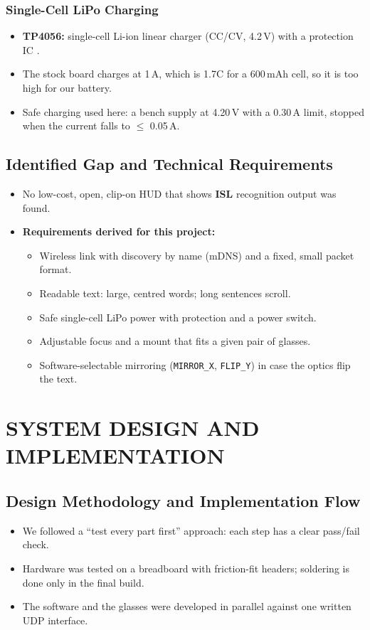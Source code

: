 \documentclass[12pt,a4paper]{report}
\begin{document}
\subsection{Single-Cell LiPo Charging}
\begin{itemize}
  \item \textbf{TP4056:} single-cell Li-ion linear charger (CC/CV, 4.2\,V) with a protection IC \cite{tp4056}.
  \item The stock board charges at 1\,A, which is 1.7C for a 600\,mAh cell, so it is too high for our battery.
  \item Safe charging used here: a bench supply at 4.20\,V with a 0.30\,A limit, stopped when the current falls to $\le$ 0.05\,A.
\end{itemize}

\section{Identified Gap and Technical Requirements}
\begin{itemize}
  \item No low-cost, open, clip-on HUD that shows \textbf{ISL} recognition output was found.
  \item \textbf{Requirements derived for this project:}
  \begin{itemize}
    \item Wireless link with discovery by name (mDNS) and a fixed, small packet format.
    \item Readable text: large, centred words; long sentences scroll.
    \item Safe single-cell LiPo power with protection and a power switch.
    \item Adjustable focus and a mount that fits a given pair of glasses.
    \item Software-selectable mirroring (\texttt{MIRROR\_X}, \texttt{FLIP\_Y}) in case the optics flip the text.
  \end{itemize}
\end{itemize}

\chapter{SYSTEM DESIGN AND IMPLEMENTATION}

\section{Design Methodology and Implementation Flow}
\begin{itemize}
  \item We followed a ``test every part first'' approach: each step has a clear pass/fail check.
  \item Hardware was tested on a breadboard with friction-fit headers; soldering is done only in the final build.
  \item The software and the glasses were developed in parallel against one written UDP interface.
\end{itemize}
\end{document}
